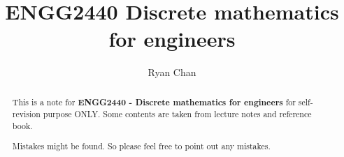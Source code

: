 \documentclass[a4paper]{report}
\author{Ryan Chan}
\title{ENGG2440 Discrete mathematics for engineers}
\begin{document}
\setlength\parindent{0pt}

\maketitle

\newpage

\begin{abstract}
	This is a note for \textbf{ENGG2440 - Discrete mathematics for engineers} for self-revision purpose ONLY. Some contents are taken from lecture notes and reference book. 
	
	Mistakes might be found. So please feel free to point out any mistakes.
\end{abstract}

\newpage

\tableofcontents

\setlength{\parskip}{5pt}
\end{document}
